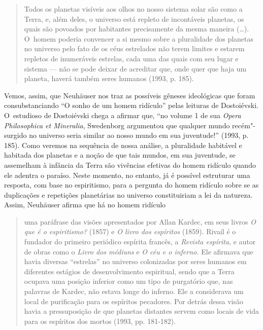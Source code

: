 \begin{quote}
Todos os planetas visíveis aos olhos no nosso sistema solar são como a
Terra, e, além deles, o universo está repleto de incontáveis planetas,
os quais são povoados por habitantes precisamente da mesma maneira
(\ldots). O~homem poderia convencer a si mesmo sobre a pluralidade dos
planetas no universo pelo fato de os céus estrelados não terem limites e
estarem repletos de inumeráveis estrelas, cada uma das quais com seu
lugar e sistema --- não se pode deixar de acreditar que, onde quer que
haja um planeta, haverá também seres humanos (1993, p. 185).
\end{quote}

Vemos, assim, que Neuhäuser nos traz as possíveis gêneses ideológicas
que foram consubstanciando ``O sonho de um homem ridículo'' pelas
leituras de Dostoiévski. O~estudioso de Dostoiévski chega a afirmar que,
``no volume 1 de sua \emph{Opera Philosophica et Mineralia}, Swedenborg
argumentou que qualquer mundo recém"-surgido no universo seria similar ao
nosso mundo em sua juventude!'' (1993, p. 185). Como veremos na
sequência de nossa análise, a pluralidade habitável e habitada dos
planetas e a noção de que tais mundos, em sua juventude, se assemelham à
infância da Terra são vivências efetivas do homem ridículo quando ele
adentra o paraíso. Neste momento, no entanto, já é possível estruturar
uma resposta, com base no espiritismo, para a pergunta do homem ridículo
sobre se as duplicações e repetições planetárias no universo
constituiriam a lei da natureza. Assim, Neuhäuser afirma que há no homem
ridículo

\begin{quote}
uma paráfrase das visões apresentados por Allan Kardec, em seus livros
\emph{O que é o espiritismo?} (1857) e \emph{O livro dos espíritos}
(1859). Rivail é o fundador do primeiro periódico espírita francês, a
\emph{Revista espírita}, e autor de obras como o \emph{Livro dos
médiuns} e \emph{O céu e o inferno.} Ele afirmava que havia diversas
``estrelas'' no universo colonizadas por seres humanos em diferentes
estágios de desenvolvimento espiritual, sendo que a Terra ocupava uma
posição inferior como um tipo de purgatório que, nas palavras de Kardec,
não estava longe do inferno. Ele a considerava um local de purificação
para os espíritos pecadores. Por detrás dessa visão havia a
pressuposição de que planetas distantes servem como locais de vida para
os espíritos dos mortos (1993, pp. 181-182).
\end{quote}

